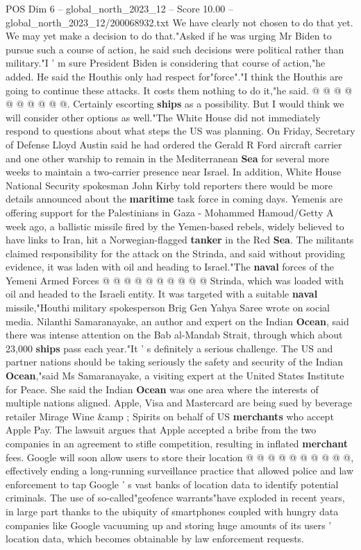 \begin{textsample}{POS Dim 6 – global\_north\_2023\_12 – Score 10.00 – global\_north\_2023\_12/200068932.txt}
We have clearly not chosen to do that yet.
We may yet make a decision to do that."Asked if he was urging Mr Biden to pursue such a course of action, he said such decisions were political rather than military."I ' m sure President Biden is considering that course of action,"he added.
He said the Houthis only had respect for"force"."I think the Houthis are going to continue these attacks.
It costs them nothing to do it,"he said. @ @ @ @ @ @ @ @ @ @.
Certainly escorting \textbf{ships} as a possibility.
But I would think we will consider other options as well."The White House did not immediately respond to questions about what steps the US was planning.
On Friday, Secretary of Defense Lloyd Austin said he had ordered the Gerald R Ford aircraft carrier and one other warship to remain in the Mediterranean \textbf{Sea} for several more weeks to maintain a two-carrier presence near Israel.
In addition, White House National Security spokesman John Kirby told reporters there would be more details announced about the \textbf{maritime} task force in coming days.
Yemenis are offering support for the Palestinians in Gaza - Mohammed Hamoud/Getty A week ago, a ballistic missile fired by the Yemen-based rebels, widely believed to have links to Iran, hit a Norwegian-flagged \textbf{tanker} in the Red \textbf{Sea}.
The militants claimed responsibility for the attack on the Strinda, and said without providing evidence, it was laden with oil and heading to Israel."The \textbf{naval} forces of the Yemeni Armed Forces @ @ @ @ @ @ @ @ @ @ Strinda, which was loaded with oil and headed to the Israeli entity.
It was targeted with a suitable \textbf{naval} missile,"Houthi military spokesperson Brig Gen Yahya Saree wrote on social media.
Nilanthi Samaranayake, an author and expert on the Indian \textbf{Ocean}, said there was intense attention on the Bab al-Mandab Strait, through which about 23,000 \textbf{ships} pass each year."It ' s definitely a serious challenge.
The US and partner nations should be taking seriously the safety and security of the Indian \textbf{Ocean},"said Ms Samaranayake, a visiting expert at the United States Institute for Peace.
She said the Indian \textbf{Ocean} was one area where the interests of multiple nations aligned.
Apple, Visa and Mastercard are being sued by beverage retailer Mirage Wine \&amp ; Spirits on behalf of US \textbf{merchants} who accept Apple Pay.
The lawsuit argues that Apple accepted a bribe from the two companies in an agreement to stifle competition, resulting in inflated \textbf{merchant} fees.
Google will soon allow users to store their location @ @ @ @ @ @ @ @ @ @, effectively ending a long-running surveillance practice that allowed police and law enforcement to tap Google ' s vast banks of location data to identify potential criminals.
The use of so-called"geofence warrants"have exploded in recent years, in large part thanks to the ubiquity of smartphones coupled with hungry data companies like Google vacuuming up and storing huge amounts of its users ' location data, which becomes obtainable by law enforcement requests.

\end{textsample}
